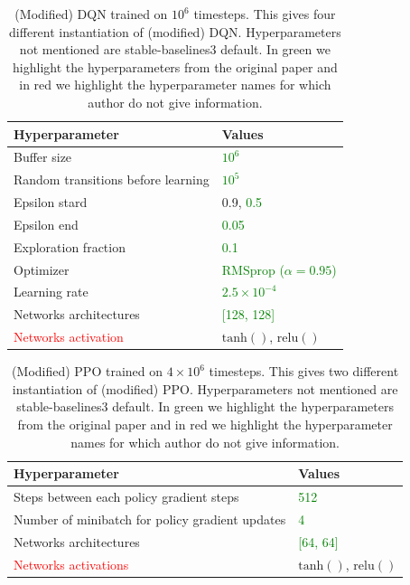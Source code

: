 \begin{table}[h]
    \centering
    \caption{(Modified) DQN trained on $10^6$ timesteps. This gives four different instantiation of (modified) DQN. Hyperparameters not mentioned are stable-baselines3 default. In green we highlight the hyperparameters from the original paper and in red we highlight the hyperparameter names for which author do not give information.}\label{tab:ibmdp-rl1}
    \begin{tabular}{ll}
    \toprule
    \textbf{Hyperparameter} & \textbf{Values}\\
    \midrule
    Buffer size & \textcolor{green}{$10^6$} \\
    Random transitions before learning & \textcolor{green}{$10^5$} \\
    Epsilon stard & 0.9, \textcolor{green}{0.5} \\
    Epsilon end & \textcolor{green}{0.05} \\
    Exploration fraction & \textcolor{green}{0.1} \\
    Optimizer & \textcolor{green}{RMSprop ($\alpha = 0.95$)}\\
    Learning rate & \textcolor{green}{$2.5\times10^{-4}$}\\
    Networks architectures & \textcolor{green}{[128, 128]}\\
    \textcolor{red}{Networks activation} & $\operatorname{tanh()}$, $\operatorname{relu()}$\\
    \bottomrule
    \end{tabular}
    \end{table}

\begin{table}[h]
    \centering
    \caption{(Modified) PPO trained on $4\times10^6$ timesteps. This gives two different instantiation of (modified) PPO. Hyperparameters not mentioned are stable-baselines3 default. In green we highlight the hyperparameters from the original paper and in red we highlight the hyperparameter names for which author do not give information.}\label{tab:ibmdp-rl2}
    \begin{tabular}{ll}
    \toprule
    \textbf{Hyperparameter} & \textbf{Values}\\
    \midrule
    Steps between each policy gradient steps & \textcolor{green}{512} \\
    Number of minibatch for policy gradient updates & \textcolor{green}{4} \\
    Networks architectures & \textcolor{green}{[64, 64]}\\
    \textcolor{red}{Networks activations} & $\operatorname{tanh()}$, $\operatorname{relu()}$\\
    \bottomrule
    \end{tabular}
    \end{table}


